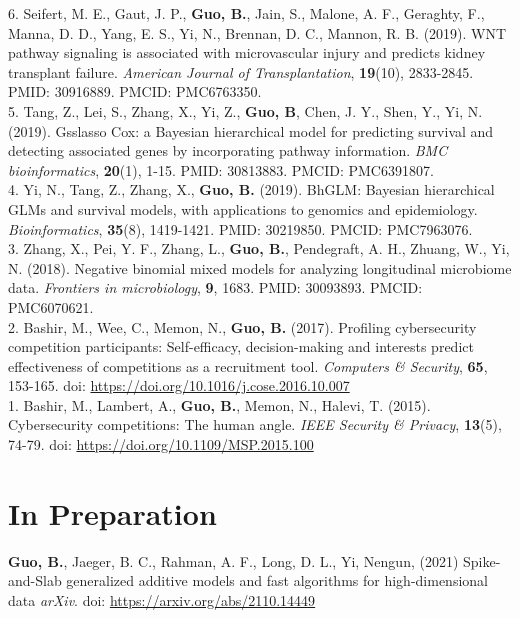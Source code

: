 6. Seifert, M. E., Gaut, J. P., {\bf Guo, B.}, Jain, S., Malone, A. F., Geraghty, F., Manna, D. D., Yang, E. S., Yi, N., Brennan, D. C., Mannon, R. B. (2019). WNT pathway signaling is associated with microvascular injury and predicts kidney transplant failure. {\it American Journal of Transplantation}, {\bf 19}(10), 2833-2845. PMID: 30916889. PMCID: PMC6763350. \\

5. Tang, Z., Lei, S., Zhang, X., Yi, Z.,  {\bf Guo, B}, Chen, J. Y., Shen, Y.,  Yi, N. (2019). Gsslasso Cox: a Bayesian hierarchical model for predicting survival and detecting associated genes by incorporating pathway information. {\it BMC bioinformatics}, {\bf 20}(1), 1-15. PMID: 30813883. PMCID: PMC6391807.\\

4. Yi, N., Tang, Z., Zhang, X., {\bf Guo, B.} (2019). BhGLM: Bayesian hierarchical GLMs and survival models, with applications to genomics and epidemiology. {\it Bioinformatics}, {\bf 35}(8), 1419-1421. PMID: 30219850. PMCID: PMC7963076.\\

3. Zhang, X., Pei, Y. F., Zhang, L., {\bf Guo, B.}, Pendegraft, A. H., Zhuang, W., Yi, N. (2018). Negative binomial mixed models for analyzing longitudinal microbiome data. {\it Frontiers in microbiology}, {\bf 9}, 1683. PMID: 30093893. PMCID: PMC6070621.\\

2. Bashir, M., Wee, C., Memon, N., {\bf Guo, B.} (2017). Profiling cybersecurity competition participants: Self-efficacy, decision-making and interests predict effectiveness of competitions as a recruitment tool. {\it Computers \& Security}, {\bf 65}, 153-165. doi: \url{https://doi.org/10.1016/j.cose.2016.10.007}\\

1. Bashir, M., Lambert, A., {\bf Guo, B.}, Memon, N., Halevi, T. (2015). Cybersecurity competitions: The human angle. {\it IEEE Security \& Privacy}, {\bf 13}(5), 74-79. doi: \url{https://doi.org/10.1109/MSP.2015.100}\\

\section{In Preparation}

\vspace{-3ex}

\textbf{Guo, B.}, Jaeger, B. C., Rahman, A. F., Long, D. L., Yi, Nengun, (2021) Spike-and-Slab generalized additive models and fast algorithms for high-dimensional data {\it arXiv}. doi: \url{https://arxiv.org/abs/2110.14449}\\

